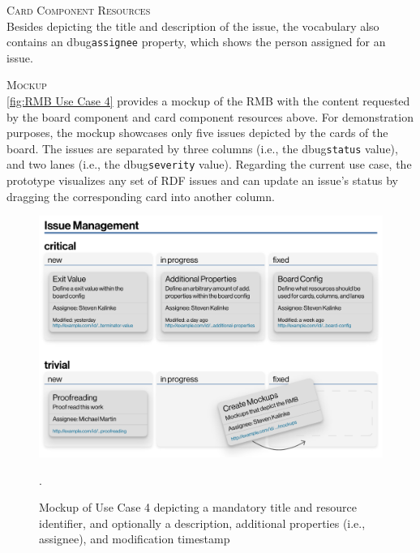 \vspace*{\baselineskip}

\noindent \textsc{Card Component Resources}\\
\noindent Besides depicting the title and description of the issue, the  vocabulary also contains an \acrshort{dbug}\texttt{assignee} property, which shows the person assigned for an issue.


\vspace*{\baselineskip}

\noindent \textsc{Mockup}\\
\noindent \autoref{fig:RMB Use Case 4} provides a mockup of the \acrshort*{RMB} with the content requested by the board component and card component resources above. For demonstration purposes, the mockup showcases only five issues depicted by the cards of the board. The issues are separated by three columns (i.e., the \acrshort{dbug}\texttt{status} value), and two lanes (i.e., the \acrshort{dbug}\texttt{severity} value). Regarding the current use case, the prototype visualizes any set of \acrshort{RDF} issues and can update an issue’s status by dragging the corresponding card into another column.

\begin{figure}[ht]
    \libertineLF
    \centering
    \includegraphics[width=154mm]{img/31-UseCase4.pdf}
    \caption[ Mockup of Use Case 4]{ Mockup of Use Case 4 depicting a mandatory title and resource identifier, and optionally a description, additional properties (i.e., assignee), and modification timestamp}.
	\label{fig:RMB Use Case 4}
\end{figure}


